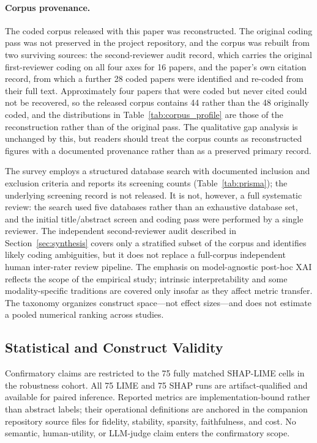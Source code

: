 \documentclass[10pt]{article}
\begin{document}
\paragraph{Corpus provenance.} The coded corpus released with this paper was
reconstructed. The original coding pass was not preserved in the project
repository, and the corpus was rebuilt from two surviving sources: the
second-reviewer audit record, which carries the original first-reviewer coding
on all four axes for 16 papers, and the paper's own citation record, from which
a further 28 coded papers were identified and re-coded from their full text.
Approximately four papers that were coded but never cited could not be
recovered, so the released corpus contains 44 rather than the 48 originally
coded, and the distributions in Table~\ref{tab:corpus_profile} are those of the
reconstruction rather than of the original pass. The qualitative gap analysis is
unchanged by this, but readers should treat the corpus counts as reconstructed
figures with a documented provenance rather than as a preserved primary record.

The survey employs a structured database search with documented inclusion
and exclusion criteria and reports its screening counts
(Table~\ref{tab:prisma}); the underlying screening record is not released.
It is not, however, a full systematic review:
the search used five databases rather than an exhaustive database set,
and the initial title/abstract screen and coding pass were performed by a
single reviewer. The independent second-reviewer audit described in
Section~\ref{sec:synthesis} covers only a stratified subset of the corpus
and identifies likely coding ambiguities, but it does not replace a
full-corpus independent human inter-rater review pipeline.
The emphasis on model-agnostic post-hoc XAI reflects the scope of the
empirical study; intrinsic interpretability and some modality-specific
traditions are covered only insofar as they affect metric transfer. The
taxonomy organizes construct space---not effect sizes---and does not
estimate a pooled numerical ranking across studies.

\subsection{Statistical and Construct Validity}

Confirmatory claims are restricted to the 75 fully matched SHAP-LIME
cells in the robustness cohort. All 75 LIME and 75 SHAP runs are artifact-qualified and available
for paired inference. Reported metrics are implementation-bound
rather than abstract labels; their operational definitions are anchored
in the companion repository source files for fidelity, stability,
sparsity, faithfulness, and cost. No semantic, human-utility, or
LLM-judge claim enters the confirmatory scope.
\end{document}
